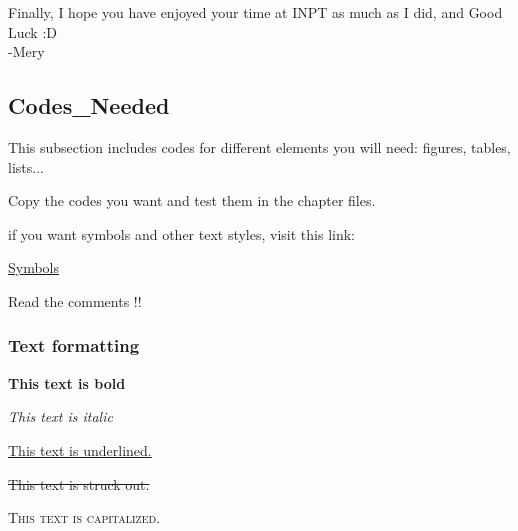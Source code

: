 Finally, I hope you have enjoyed your time at INPT as much as I did, and Good Luck :D
\\

-Mery


\subsection{Codes\_Needed}

This subsection includes codes for different elements you will need: figures, tables, lists...

Copy the codes you want and test them in the chapter files.

if you want symbols and other text styles, visit this link: 

\href{https://www.cmor-faculty.rice.edu/~heinken/latex/symbols.pdf}{Symbols}

Read the comments !!



\subsubsection{Text formatting}

\textbf{This text is bold}

\textit{This text is italic}

\underline{This text is underlined.}

\st{This text is struck out.}

\textsc{This text is capitalized.}




